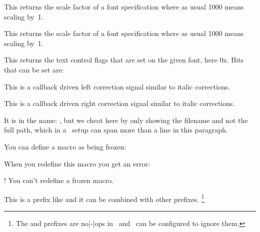 \stopnewprimitive

\startnewprimitive[title={\prm {fontspecxscale}}]

This returns the scale factor of a font specification where as usual 1000 means
scaling by~1.

\stopnewprimitive

\startnewprimitive[title={\prm {fontspecyscale}}]

This returns the scale factor of a font specification where as usual 1000 means
scaling by~1.

\stopnewprimitive

\startnewprimitive[title={\prm {fonttextcontrol}}]

This returns the text control flags that are set on the given font, here {\tttf
0x\tohexadecimal \fonttextcontrol \font}. Bits that can be set are:


\stopnewprimitive

\startnewprimitive[title={\prm {forcedleftcorrection}}]

This is a callback driven left correction signal similar to italic corrections.

\stopnewprimitive

\startnewprimitive[title={\prm {forcedrightcorrection}}]

This is a callback driven right correction signal similar to italic corrections.

\stopnewprimitive

\startnewprimitive[title={\prm {formatname}}]

It is in the name: {\tttf \filenameonly {\formatname}}, but we cheat here by only
showing the filename and not the full path, which in a \CONTEXT\ setup can span
more than a line in this paragraph.

\stopnewprimitive

\startnewprimitive[title={\prm {frozen}}]

You can define a macro as being frozen:

\starttyping
\frozen{}
\stoptyping

When you redefine this macro you get an error:

\starttyping
! You can't redefine a frozen macro.
\stoptyping

This is a prefix like  and it can be combined with other prefixes.
\footnote {The  and  prefixes are no|-|ops in
\LUAMETATEX\ and \LUATEX\ can be configured to ignore them.}


